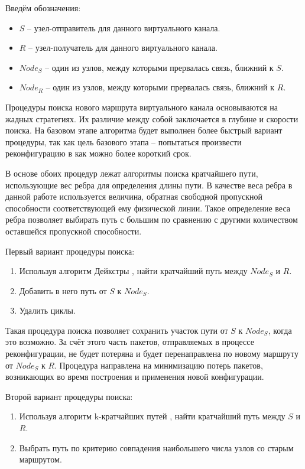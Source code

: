 \documentclass[12pt, a4paper]{article}
\begin{document}
Введём обозначения:
\begin{itemize}
	\item $S$ -- узел-отправитель для данного виртуального канала.
	\item $R$ -- узел-получатель для данного виртуального канала.
	\item $Node_{S}$ – один из узлов, между которыми прервалась связь, ближний к $S$.
	\item $Node_{R}$ – один из узлов, между которыми прервалась связь, ближний к $R$.
\end{itemize}

Процедуры поиска нового маршрута виртуального канала основываются на жадных стратегиях. Их различие между собой заключается в глубине и скорости поиска. На базовом этапе алгоритма будет выполнен более быстрый вариант процедуры, так как цель базового этапа -- попытаться произвести реконфигурацию в как можно более короткий срок.

В основе обоих процедур лежат алгоритмы поиска кратчайшего пути, использующие вес ребра для определения длины пути. В качестве веса ребра в данной работе используется величина, обратная свободной пропускной способности соответствующей ему физической линии. Такое определение веса ребра позволяет выбирать путь с большим по сравнению с другими количеством оставшейся пропускной способности. 

Первый вариант процедуры поиска:
\begin{enumerate}
	\item Используя алгоритм Дейкстры \cite{dejkstra}, найти кратчайший путь между $Node_{S}$ и $R$.
	\item Добавить в него путь от $S$ к $Node_{S}$.
	\item Удалить циклы.
\end{enumerate}

Такая процедура поиска позволяет сохранить участок пути от $S$ к $Node_{S}$, когда это возможно. За счёт этого часть пакетов, отправляемых в процессе реконфигурации, не будет потеряна и будет перенаправлена по новому маршруту от $Node_{S}$ к $R$. Процедура направлена на минимизацию потерь пакетов, возникающих во время построения и применения новой конфигурации.

Второй вариант процедуры поиска:
\begin{enumerate}
	\item Используя алгоритм k-кратчайших путей \cite{kshort}, найти кратчайший путь между $S$ и $R$.
	\item Выбрать путь по критерию совпадения наибольшего числа узлов со старым маршрутом.
\end{enumerate}
\end{document}
